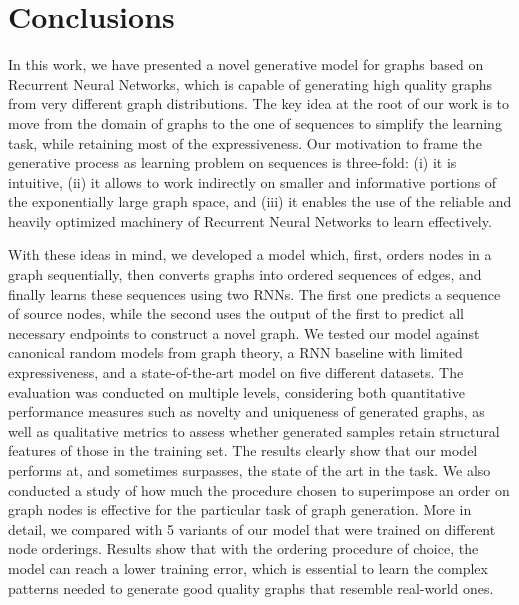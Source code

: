 \section{Conclusions}
In this work, we have presented a novel generative model for graphs based on Recurrent Neural Networks, which is capable of generating high quality graphs from very different graph distributions. The key idea at the root of our work is to move from the domain of graphs to the one of sequences to simplify the learning task, while retaining most of the expressiveness. Our motivation to frame the generative process as learning problem on sequences is three-fold: (i) it is intuitive, (ii) it allows to work indirectly on smaller and informative portions of the exponentially large graph space, and (iii) it enables the use of the reliable and heavily optimized machinery of Recurrent Neural Networks to learn effectively.

With these ideas in mind, we developed a model which, first, orders nodes in a graph sequentially, then converts graphs into ordered sequences of edges, and finally learns these sequences using two RNNs. The first one predicts a sequence of source nodes, while the second uses the output of the first to predict all necessary endpoints to construct a novel graph. We tested our model against canonical random models from graph theory, a RNN baseline with limited expressiveness, and a state-of-the-art model on five different datasets. The evaluation was conducted on multiple levels, considering both quantitative performance measures such as novelty and uniqueness of generated graphs, as well as qualitative metrics to assess whether generated samples retain structural features of those in the training set. The results clearly show that our model performs at, and sometimes surpasses, the state of the art in the task.
We also conducted a study of how much the procedure chosen to superimpose an order on graph nodes is effective for the particular task of graph generation. More in detail, we compared with 5 variants of our model that were trained on different node orderings. Results show that with the ordering procedure of choice, the model can reach a lower training error, which is essential to learn the complex patterns needed to generate good quality graphs that resemble real-world ones.

